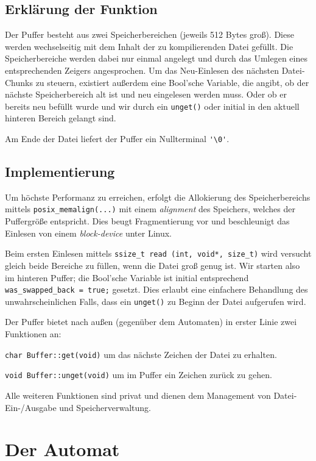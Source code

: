 \documentclass[
a4paper,   %
11pt,      %
oneside,   %
onecolumn, %
final      %
]{article}
\newcommand{\code}[1]{\lstinline$#1$}
\begin{document}
\subsection{Erklärung der Funktion}
Der Puffer besteht aus zwei Speicherbereichen (jeweils 512 Bytes groß).
Diese werden wechselseitig mit dem Inhalt der zu kompilierenden Datei gefüllt.
Die Speicherbereiche werden dabei nur einmal angelegt und durch das Umlegen eines entsprechenden Zeigers angesprochen.
Um das Neu-Einlesen des nächsten Datei-Chunks zu steuern, existiert außerdem eine Bool'sche Variable, die angibt, ob der nächste Speicherbereich alt ist und neu eingelesen werden muss.
Oder ob er bereits neu befüllt wurde und wir durch ein \code{unget()} oder initial in den aktuell hinteren Bereich gelangt sind.

Am Ende der Datei liefert der Puffer ein Nullterminal \code{'\0'}.

\subsection{Implementierung}
Um höchste Performanz zu erreichen, erfolgt die Allokierung des Speicherbereichs mittels \code{posix_memalign(...)} mit einem \emph{alignment} des Speichers, welches der Puffergröße entspricht.
Dies beugt Fragmentierung vor und beschleunigt das Einlesen von einem \emph{block-device} unter Linux.

Beim ersten Einlesen mittels \code{ssize_t read (int, void*, size_t)} wird versucht gleich beide Bereiche zu füllen, wenn die Datei groß genug ist.
Wir starten also im hinteren Puffer; die Bool'sche Variable ist initial entsprechend \code{was_swapped_back = true;} gesetzt.
Dies erlaubt eine einfachere Behandlung des unwahrscheinlichen Falls, dass ein \code{unget()} zu Beginn der Datei aufgerufen wird.

Der Puffer bietet nach außen (gegenüber dem Automaten) in erster Linie zwei Funktionen an:
\begin{description}
\item \code{char Buffer::get(void)} um das nächste Zeichen der Datei zu erhalten.
\item \code{void Buffer::unget(void)} um im Puffer ein Zeichen zurück zu gehen.
\end{description}
Alle weiteren Funktionen sind privat und dienen dem Management von Datei-Ein-/Ausgabe und Speicherverwaltung.




\section{Der Automat} \label{sec:autom}
\end{document}
